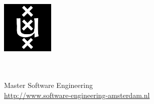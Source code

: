 \documentclass[11pt, oneside]{Thesis} %
\begin{document}
\begin{titlepage}
\begin{center}
\begin{minipage}{0.1\textwidth}
\begin{flushright}
\includegraphics[width=2.5cm]{Logo.jpeg}
\end{flushright}
\end{minipage}
\hfill
\begin{minipage}{0.8\textwidth}
{\huge \univname}\\
\deptname\\
Master Software Engineering\\
\href{http://www.software-engineering-amsterdam.nl}{http://www.software-engineering-amsterdam.nl} 
\end{minipage} 

\vfill
\end{center}

\end{titlepage}


\end{document}
